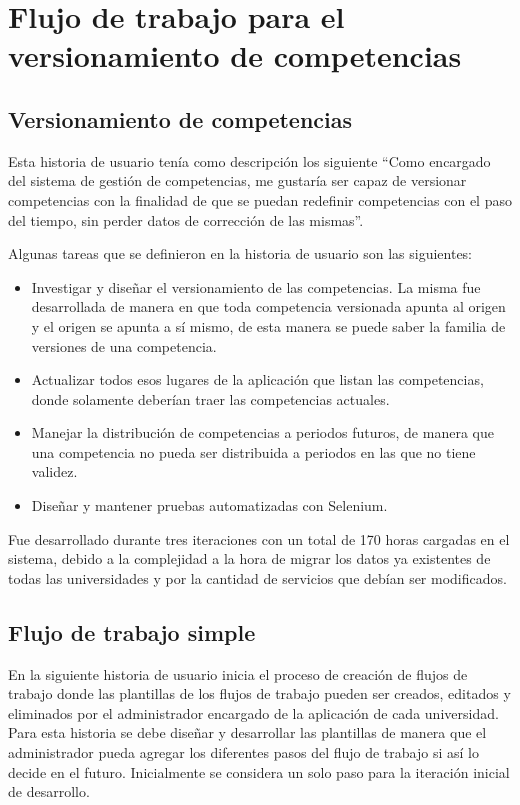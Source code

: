 \section{Flujo de trabajo para el versionamiento de competencias}
\subsection{Versionamiento de competencias}
Esta historia de usuario tenía como descripción los siguiente \enquote{Como encargado del sistema de gestión de competencias, me gustaría ser capaz de versionar competencias con la finalidad de que se puedan redefinir competencias con el paso del tiempo, sin perder datos de corrección de las mismas}.

Algunas tareas que se definieron en la historia de usuario son las siguientes:
\begin{itemize}
	\item Investigar y diseñar el versionamiento de las competencias. La misma fue desarrollada de manera en que toda competencia versionada apunta al origen y el origen se apunta a sí mismo, de esta manera se puede saber la familia de versiones de una competencia.
	\item Actualizar todos esos lugares de la aplicación que listan las competencias, donde solamente deberían traer las competencias actuales.
	\item Manejar la distribución de competencias a periodos futuros, de manera que una competencia no pueda ser distribuida a periodos en las que no tiene validez.
	\item Diseñar y mantener pruebas automatizadas con Selenium.
\end{itemize}

Fue desarrollado durante tres iteraciones con un total de 170 horas cargadas en el sistema, debido a la complejidad a la hora de migrar los datos ya existentes de todas las universidades y por la cantidad de servicios que debían ser modificados.

\subsection{Flujo de trabajo simple}
En la siguiente historia de usuario inicia el proceso de creación de flujos de trabajo donde las plantillas de los flujos de trabajo pueden ser creados, editados y eliminados por el administrador encargado de la aplicación de cada universidad. Para esta historia se debe diseñar y desarrollar las plantillas de manera que el administrador pueda agregar los diferentes pasos del flujo de trabajo si así lo decide en el futuro. Inicialmente se considera un solo paso para la iteración inicial de desarrollo.

